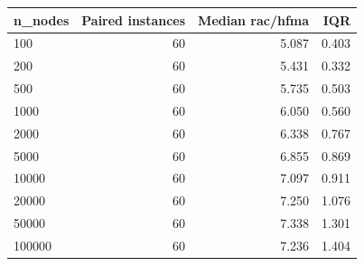 \begin{tabular}{lrrr}
\toprule
n\_nodes & Paired instances & Median rac/hfma & IQR \\
\midrule
100 & 60 & 5.087 & 0.403 \\
200 & 60 & 5.431 & 0.332 \\
500 & 60 & 5.735 & 0.503 \\
1000 & 60 & 6.050 & 0.560 \\
2000 & 60 & 6.338 & 0.767 \\
5000 & 60 & 6.855 & 0.869 \\
10000 & 60 & 7.097 & 0.911 \\
20000 & 60 & 7.250 & 1.076 \\
50000 & 60 & 7.338 & 1.301 \\
100000 & 60 & 7.236 & 1.404 \\
\bottomrule
\end{tabular}
